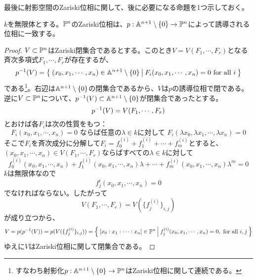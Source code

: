 \documentclass{ltjsreport}
\begin{document}
最後に射影空間のZariski位相に関して、後に必要になる命題を1つ示しておく。

\begin{prop}\label{zariski_vs_quotient}
  $k$を無限体とする。$\mathbb{P}^n$のZariski位相は、$p:\mathbb{A}^{n+1}\setminus\{0\}\rightarrow \mathbb{P}^n$によって誘導される位相に一致する。
\end{prop}

\begin{proof}
  $V\subset\mathbb{P}^n$はZariski閉集合であるとする。このとき$V=V(F_1,\cdots,F_r)$となる斉次多項式$F_1,\cdots,F_r$が存在するが、
  \[
  p^{-1}(V)=\left\{\:(x_0,x_1,\cdots,x_n)\in\mathbb{A}^{n+1}\setminus\{0\}\:\middle|\:F_i(x_0,x_1,\cdots,x_n)=0\text{ for all $i$}\:\right\}  
  \]
  である\footnote{
    すなわち射影化$p:\mathbb{A}^{n+1}\setminus\{0\}\rightarrow\mathbb{P}^n$はZariski位相に関して連続である。
  }。右辺は$\mathbb{A}^{n+1}\setminus\{0\}$の閉集合であるから、$V$は$p$の誘導位相で閉である。逆に$V\subset\mathbb{P}^n$について、$p^{-1}(V)\subset\mathbb{A}^{n+1}\setminus\{0\}$が閉集合であったとする。
  \[
  p^{-1}(V)=V(F_1,\cdots,F_r)  
  \]
  とおけば各$F_i$は次の性質をもつ：
  \[
  F_i(x_0,x_1,\cdots,x_n)=0\text{ ならば任意の$\lambda\in k$に対して }F_i(\lambda x_0,\lambda x_1,\cdots,\lambda x_n)=0  
  \]
  そこで$F_i$を斉次成分に分解して$F_i=f^{(i)}_0+f^{(i)}_1+\cdots+f^{(i)}_m$とすると、$(x_0,x_1,\cdots,x_n)\in V(F_1,\cdots,F_r)$ならばすべての$\lambda\in k$に対して
  \[
  f^{(i)}_0(x_0,x_1,\cdots,x_n)+f^{(i)}_1(x_0,x_1,\cdots,x_n)\lambda+\cdots+f^{(i)}_m(x_0,x_1,\cdots,x_n)\lambda^m=0  
  \]
  $k$は無限体なので
  \[
  f^{i}_j(x_0,x_1,\cdots,x_n)=0  
  \]
  でなければならない。したがって
  \[
    V(F_1,\cdots,F_r)=V(\{f^{(i)}_j\}_{i,j})  
  \]
  が成り立つから、
  \[
  V=p(p^{-1}(V))=p(V(\{f^{(i)}_j\}_{i,j}))=\left\{\:[x_0:x_1:\dots:x_n]\in\mathbb{P}^n\:\middle|\:f^{(i)}_j(x_0,x_1,\cdots,x_n)=0,\text{ for all }i,j\:\right\}  
  \]
  ゆえに$V$はZariski位相に関して閉集合である。
\end{proof}
\end{document}
